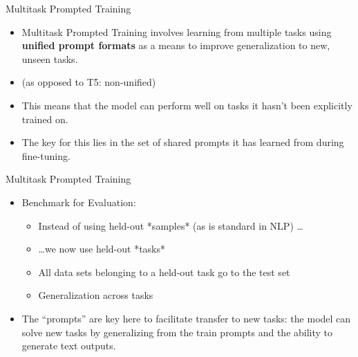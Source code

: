 \begin{frame}{Multitask Prompted
		Training}

\vfill

\begin{itemize}
    \item Multitask Prompted Training
    involves learning from multiple
    tasks using \textbf{unified prompt formats} as a means to improve
    generalization to new, unseen tasks.
    \item (as opposed to T5: non-unified)
    \item This means that the model can perform well on tasks it hasn't been explicitly trained on.
    \item The key for this lies in the set of shared prompts it has learned from during fine-tuning.
\end{itemize}

\vfill

\end{frame}


\begin{frame}{Multitask Prompted Training}

\vfill

\begin{itemize}
    \item Benchmark for Evaluation:
        \begin{itemize}
        \item Instead of using held-out *samples* (as is
        standard in NLP) \ldots
        \item \ldots we now use held-out *tasks*
            \item All data sets belonging to a held-out task go to the test set
            \item Generalization across tasks %
        \end{itemize}
    \item The ``prompts'' are key here to
facilitate
        transfer to new tasks:  the model can solve new
        tasks by generalizing from  the train prompts and the ability to generate text outputs.
\end{itemize}

\vfill

\end{frame}

